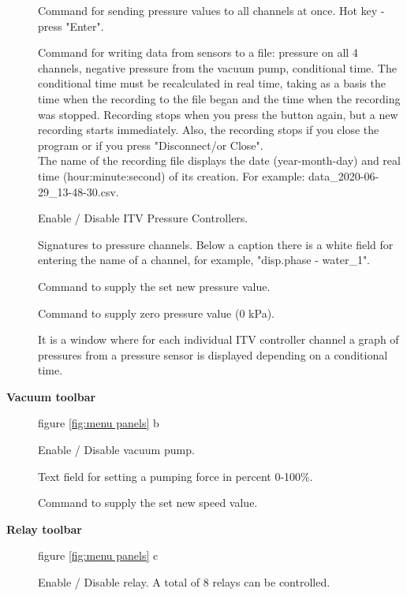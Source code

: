 \documentclass[twoside, 12pt, a4paper]{refart}
\begin{document}
\begin{description}
       Command for sending pressure values to all channels at once. Hot key - press "Enter".
      
       Command for writing data from sensors to a file: pressure on all 4 channels, negative pressure from the vacuum pump, conditional time. The conditional time must be recalculated in real time, taking as a basis the time when the recording to the file began and the time when the recording was stopped. Recording stops when you press the button again, but a new recording starts immediately. Also, the recording stops if you close the program or if you press "Disconnect/or Close".\\
      The name of the recording file displays the date (year-month-day) and real time (hour:minute:second) of its creation. For example: data\_2020-06-29\_13-48-30.csv.
      
       Enable / Disable ITV Pressure Controllers.
      
       Signatures to pressure channels. Below a caption there is a white field for entering the name of a channel, for example, "disp.phase - water\_1". 
      
       Command to supply the set new pressure value.  
            
       Command to supply zero pressure value (0 kPa). 
                  
       It is a window where for each individual ITV controller channel a graph of pressures from a pressure sensor is displayed depending on a conditional time. \\ 
               
            
    \item[\textbf{Vacuum toolbar}] figure \ref{fig:menu panels} b
      
       Enable / Disable vacuum pump. 
      
       Text field for setting a pumping force in percent 0-100\%.  
            
       Command to supply the set new speed value.     
    
    \item[\textbf{Relay toolbar}] figure \ref{fig:menu panels} c
    
       Enable / Disable relay. A total of 8 relays can be controlled.  
        

\end{description}
\end{document}
